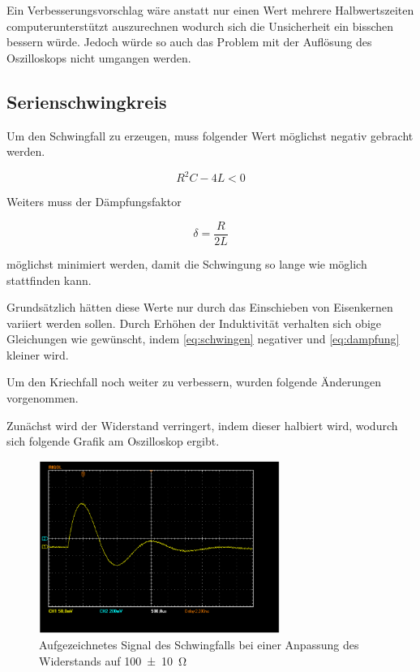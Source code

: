 \documentclass[11pt,ngerman]{scrartcl}
\begin{document}
Ein Verbesserungsvorschlag wäre anstatt nur einen Wert mehrere Halbwertszeiten
computerunterstützt auszurechnen wodurch sich die Unsicherheit ein bisschen
bessern würde. Jedoch würde so auch das Problem mit der Auflösung
des Oszilloskops nicht umgangen werden.



\subsection{Serienschwingkreis}

Um den Schwingfall zu erzeugen, muss folgender Wert möglichst negativ gebracht werden.

\begin{equation}
	\label{eq:schwingen}
	R^2 C - 4L < 0
\end{equation}

Weiters muss der Dämpfungsfaktor

\begin{equation}
	\label{eq:dampfung}
	\delta = \frac{R}{2L}
\end{equation}

möglichst minimiert werden, damit die Schwingung so lange wie möglich stattfinden kann.

\vspace{2mm}

Grundsätzlich hätten diese Werte nur durch das Einschieben von Eisenkernen
variiert werden sollen. Durch Erhöhen der Induktivität verhalten sich obige
Gleichungen wie gewünscht, indem \autoref{eq:schwingen} negativer und
\autoref{eq:dampfung} kleiner wird.

Um den Kriechfall noch weiter zu verbessern, wurden folgende Änderungen
vorgenommen.

Zunächst wird der Widerstand verringert, indem dieser halbiert wird, wodurch
sich folgende Grafik am Oszilloskop ergibt.

\begin{figure}[H]
	\begin{center}
		\includegraphics[width=0.7\textwidth]{Bild_versuch3_c_100}
	\end{center}
	\caption{Aufgezeichnetes Signal des Schwingfalls bei einer Anpassung des
		Widerstands auf \SI{100(10)}{\ohm}}
	\label{fig:schwingfall_100}
\end{figure}
\end{document}
